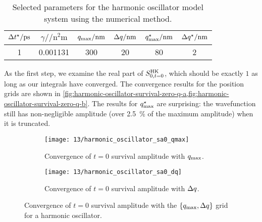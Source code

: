 \begin{table}
	\begin{center}
	\begin{tabular}{ c S[table-format=1.6] c c c c }
		\toprule
		{$\dt\alt / \si{\pico\second}$} & {$\gamma / \si{\per\square\nano\meter}$} & {$q_\mathrm{max} / \si{\nano\meter}$} & {$\Delta q / \si{\nano\meter}$} & {$q_\mathrm{max}^\star / \si{\nano\meter}$} & {$\Delta q^\star / \si{\nano\meter}$} \\
		 & 0.001131 & 300 & 20 & 80 & 2 \\
		\bottomrule
	\end{tabular}
	\end{center}
	\caption[
		Selected parameters for harmonic oscillator (numerical)
	]{
		Selected parameters for the harmonic oscillator model system using the numerical method.
	}
	\label{tab:model-sa0-harmonic-oscillator}
\end{table}

As the first step, we examine the real part of $S_{0,t=0}^\mathrm{HK}$, which should be exactly $1$ as long as our integrals have converged.
The convergence results for the position grids are shown in \cref{fig:harmonic-oscillator-survival-zero-q-a,fig:harmonic-oscillator-survival-zero-q-b}.
The results for $q_\mathrm{max}^\star$ are surprising: the wavefunction still has non-negligible amplitude (over \SI{2.5}{\percent} of the maximum amplitude) when it is truncated.

\begin{figure}
	\setlength{\figspacing}{5 mm}
	\centering
	\begin{subfigure}[b]{\textwidth}
		\texttt{[image: 13/harmonic\_oscillator\_sa0\_qmax]}
		\caption{
			Convergence of $t = 0$ survival amplitude with $q_\mathrm{max}$.
		}
		\vspace{\figspacing}
	\end{subfigure}
	\begin{subfigure}[b]{\textwidth}
		\texttt{[image: 13/harmonic\_oscillator\_sa0\_dq]}
		\caption{
			Convergence of $t = 0$ survival amplitude with $\Delta q$.
		}
	\end{subfigure}
	\caption[
		Harmonic oscillator survival amplitude convergence with position grids
	]{
		Convergence of $t = 0$ survival amplitude with the $\{ q_\mathrm{max}, \Delta q \}$ grid for a harmonic oscillator.
		\explainplotsazero{}
	}
	\label{fig:harmonic-oscillator-survival-zero-q-a}
\end{figure}

